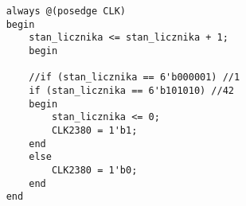 \begin{lstlisting}
	always @(posedge CLK)
	begin
		stan_licznika <= stan_licznika + 1;
		begin
	
		//if (stan_licznika == 6'b000001) //1
		if (stan_licznika == 6'b101010) //42
		begin
			stan_licznika <= 0;
			CLK2380 = 1'b1;
		end
		else
			CLK2380 = 1'b0;
		end
	end
\end{lstlisting}